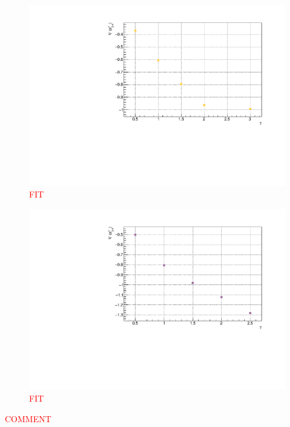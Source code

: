 \begin{figure}[H]
    \centering
    \includegraphics[scale=0.7]{Figures/12sites/12sites_gradLM_3and4VSgamma.pdf}
    \caption{\textcolor{red}{FIT}}
    \label{fig:my_label}
\end{figure}

\begin{figure}[H]
    \centering
    \includegraphics[scale=0.7]{Figures/16sites/16sites_gradLM_3and4VSgamma.pdf}
    \caption{\textcolor{red}{FIT}}
    \label{fig:my_label}
\end{figure}

\textcolor{red}{COMMENT}

